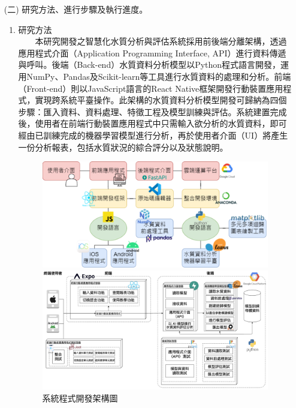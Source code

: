 \documentclass[12pt,a4paper]{article}
\begin{document}
\begin{enumerate}
\item[(二)] 研究方法、進行步驟及執行進度。
\begin{enumerate}[label=\arabic*.]
\item 研究方法\\
　　本研究開發之智慧化水質分析與評估系統採用前後端分離架構，透過應用程式介面（Application Programming Interface, API）進行資料傳遞與呼叫。後端（Back-end）水質資料分析模型以Python程式語言開發，運用NumPy、Pandas及Scikit-learn等工具進行水質資料的處理和分析。前端（Front-end）則以JavaScript語言的React Native框架開發行動裝置應用程式，實現跨系統平臺操作。此架構的水質資料分析模型開發可歸納為四個步驟：匯入資料、資料處理、特徵工程及模型訓練與評估。系統建置完成後，使用者在前端行動裝置應用程式中只需輸入欲分析的水質資料，即可經由已訓練完成的機器學習模型進行分析，再於使用者介面（UI）將產生一份分析報表，包括水質狀況的綜合評分以及狀態說明。\\
    \begin{figure}[H]
        \centering
        \begin{minipage}[t]{0.4\textwidth}
            \centering
            \includegraphics[width=\textwidth]{resources/image/開發架構圖.png}
            \caption{系統程式開發架構圖}
            \label{fig:development_architecture}
        \end{minipage}
        \hspace{0.01\textwidth}
        \begin{minipage}[t]{0.4\textwidth}
            \centering
            \includegraphics[width=\textwidth]{resources/image/部署圖.jpg}

\end{minipage}
\end{figure}
\end{enumerate}
\end{enumerate}
\end{document}
